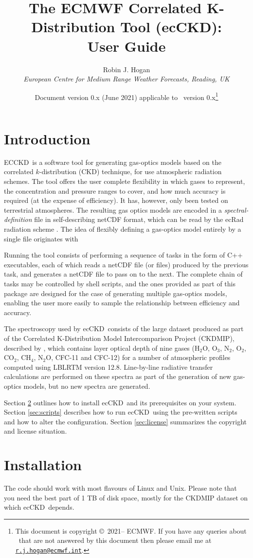 \documentclass[a4,oneside]{article}
\title{The ECMWF Correlated K-Distribution Tool (ecCKD): \\ User Guide}
\author{Robin J. Hogan\\ \emph{European Centre for Medium Range
    Weather Forecasts, Reading, UK}}
\date{Document version 0.x (June 2021) applicable to 
  \ecckd\ version 0.x\thanks{This document is copyright
    \copyright\ 2021-- ECMWF. If you have any queries about
    \ecckd\ that are not answered by this document
%
%
    then please email me at
    \href{mailto:r.j.hogan@ecmwf.int}{\texttt{r.j.hogan@ecmwf.int}}.}}
\newcommand{\ecckd}{ecCKD}
\newcommand{\Ecckd}{ECCKD}
\begin{document}
\maketitle

\section{Introduction}
\Ecckd\ is a software tool for generating gas-optics models based on
the correlated $k$-distribution (CKD) technique, for use atmospheric
radiation schemes. The tool offers the user complete flexibility in
which gases to represent, the concentration and pressure ranges to
cover, and how much accuracy is required (at the expense of
efficiency). It has, however, only been tested on terrestrial
atmospheres.  The resulting gas optics models are encoded in a
\emph{spectral-definition} file in self-describing netCDF format,
which can be read by the ecRad radiation scheme
\citep{Hogan&2018}. The idea of flexibly defining a gas-optics model
entirely by a single file originates with \cite{Edwards&1996}

Running the tool consists of performing a sequence of tasks in the
form of C++ executables, each of which reads a netCDF file (or files)
produced by the previous task, and generates a netCDF file to pass on
to the next. The complete chain of tasks may be controlled by shell
scripts, and the ones provided as part of this package are designed
for the case of generating multiple gas-optics models, enabling the
user more easily to sample the relationship between efficiency and
accuracy.

The spectroscopy used by \ecckd\ consists of the large dataset
produced as part of the Correlated K-Distribution Model
Intercomparison Project (CKDMIP), described by \cite{Hogan&2020},
which contains layer optical depth of nine gases (H$_2$O, O$_3$,
N$_2$, O$_2$, CO$_2$, CH$_4$, N$_2$O, CFC-11 and CFC-12) for a number
of atmospheric profiles computed using LBLRTM version
12.8. Line-by-line radiative transfer calculations are performed on
these spectra as part of the generation of new gas-optics models, but
no new spectra are generated.

Section \ref{sec:installation} outlines how to install \ecckd\ and its
prerequisites on your system. Section \ref{sec:scripts} describes how
to run \ecckd\ using the pre-written scripts and how to alter the
configuration. Section \ref{sec:license} summarizes the copyright
and license situation.

\section{Installation}
\label{sec:installation}
The code should work with most flavours of Linux and Unix. Please note
that you need the best part of 1 TB of disk space, mostly for the
CKDMIP dataset on which \ecckd\ depends.
\end{document}
